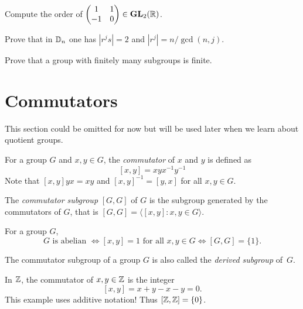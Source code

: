                                 
\begin{exercise}
        Compute the order of 
        $\begin{pmatrix}1&1\\-1&0\end{pmatrix}\in\mathbf{GL}_2(\mathbb{R})$.
\end{exercise}
                                
\begin{exercise}
        Prove that in $\mathbb{D}_n$ one has 
        $|r^js|=2$ and $|r^j|=n/\gcd(n,j)$.
\end{exercise}
                                
\begin{exercise}
        Prove that a group with finitely many subgroups
        is finite. 
\end{exercise}

\section{Commutators}

This section could be omitted for now but will be used later when we learn about quotient groups. 

For a group $G$ and $x,y\in G$, the \emph{commutator} 
of $x$ and $y$ is defined as 
\[
[x,y]=xyx^{-1}y^{-1}
\]
Note that $[x,y]yx=xy$ and 
$[x,y]^{-1}=[y,x]$ for all $x,y\in G$. 

\begin{definition}
        The \emph{commutator subgroup}
        $[G,G]$ of $G$ 
        is the subgroup generated by 
        the commutators of $G$, that is 
        $[G,G]=\langle[x,y]: x,y\in G\rangle$. 
\end{definition}

For a group $G$, 
\[
G\text{ is abelian }
\Longleftrightarrow [x,y]=1\text{ for all $x,y\in G$}
\Longleftrightarrow [G,G]=\{1\}.
\]

The commutator subgroup of a group $G$ is also called the \emph{derived subgroup} of~$G$. 
       
\begin{example}
        In $\mathbb{Z}$, the commutator of $x,y\in \mathbb{Z}$ 
        is the integer
        \[
        [x,y]=x+y-x-y=0.
        \]
        This example uses additive notation! 
        Thus $[\mathbb{Z},\mathbb{Z}]=\{0\}$. 
\end{example}
        
